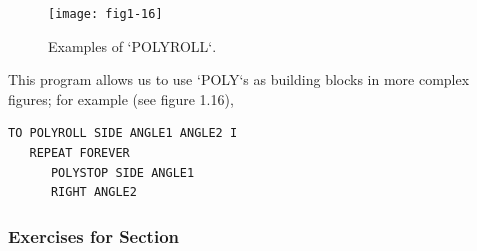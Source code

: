 \documentclass{book}
\begin{document}
\begin{figure}
\begin{center}
\texttt{[image: fig1-16]}
\caption{Examples of \textsc{`POLYROLL`}.}
\end{center}
\end{figure}

This program allows us to use \textsc{`POLY`}s as building blocks in more complex figures; for example (see figure 1.16),

\begin{verbatim}
TO POLYROLL SIDE ANGLE1 ANGLE2 I
   REPEAT FOREVER
      POLYSTOP SIDE ANGLE1
      RIGHT ANGLE2
\end{verbatim}
\subsubsection{Exercises for Section \thesection}
\end{document}
